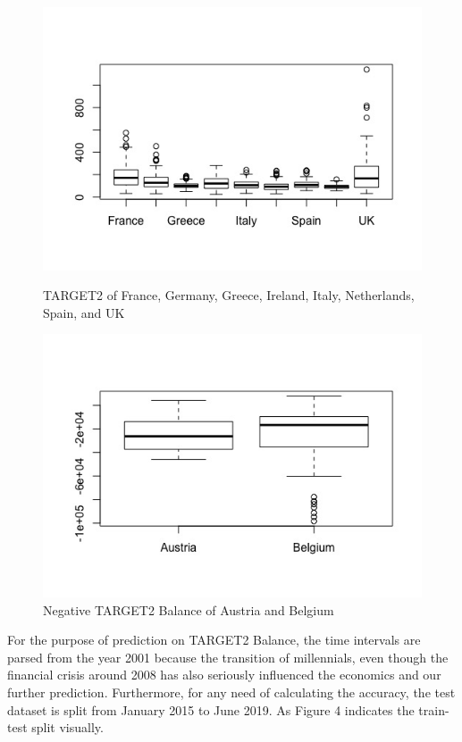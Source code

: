 \documentclass[12pt]{article}
\begin{document}
\begin{figure}[!tbp]
  \centering
  \begin{minipage}[b]{0.5\textwidth}
    \includegraphics[width=\textwidth]{Bal1.jpeg}
    \caption{TARGET2 of France, Germany, Greece, Ireland, Italy, Netherlands, Spain, and UK}
  \end{minipage}
  \hfill
  \begin{minipage}[b]{0.4\textwidth}
    \includegraphics[width=\textwidth]{Bal2.jpeg}
    \caption{Negative TARGET2 Balance of Austria and Belgium}
  \end{minipage}
\end{figure}
For the purpose of prediction on TARGET2 Balance, the time intervals are parsed from the year 2001 because the transition of millennials, even though the financial crisis around 2008 has also seriously influenced the economics and our further prediction. Furthermore, for any need of calculating the accuracy, the test dataset is split from January 2015 to June 2019. As Figure 4 indicates the train-test split visually. 
\end{document}
